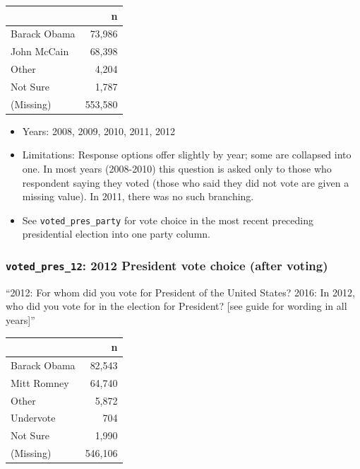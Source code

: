 \documentclass[10pt,article,oneside]{memoir}
\begin{document}
\begin{table}[H]
\centering
\begin{tabular}[t]{lr}
\toprule
 & n\\
\midrule
Barack Obama & 73,986\\
John McCain & 68,398\\
Other & 4,204\\
Not Sure & 1,787\\
(Missing) & 553,580\\
\bottomrule
\end{tabular}
\end{table}

\begin{itemize}
\tightlist
\item
  Years: 2008, 2009, 2010, 2011, 2012
\item
  Limitations: Response options offer slightly by year; some are
  collapsed into one. In most years (2008-2010) this question is asked
  only to those who respondent saying they voted (those who said they
  did not vote are given a missing value). In 2011, there was no such
  branching.
\item
  See \texttt{voted\_pres\_party} for vote choice in the most recent
  preceding presidential election into one party column.
\end{itemize}

\subsubsection{\texorpdfstring{\texttt{voted\_pres\_12}: 2012 President
vote choice (after
voting)}{voted\_pres\_12: 2012 President vote choice (after voting)}}\label{voted_pres_12-2012-president-vote-choice-after-voting}

``2012: For whom did you vote for President of the United States? 2016:
In 2012, who did you vote for in the election for President? {[}see
guide for wording in all years{]}''

\begin{table}[H]
\centering
\begin{tabular}[t]{lr}
\toprule
 & n\\
\midrule
Barack Obama & 82,543\\
Mitt Romney & 64,740\\
Other & 5,872\\
Undervote & 704\\
Not Sure & 1,990\\
(Missing) & 546,106\\
\bottomrule
\end{tabular}
\end{table}
\end{document}
